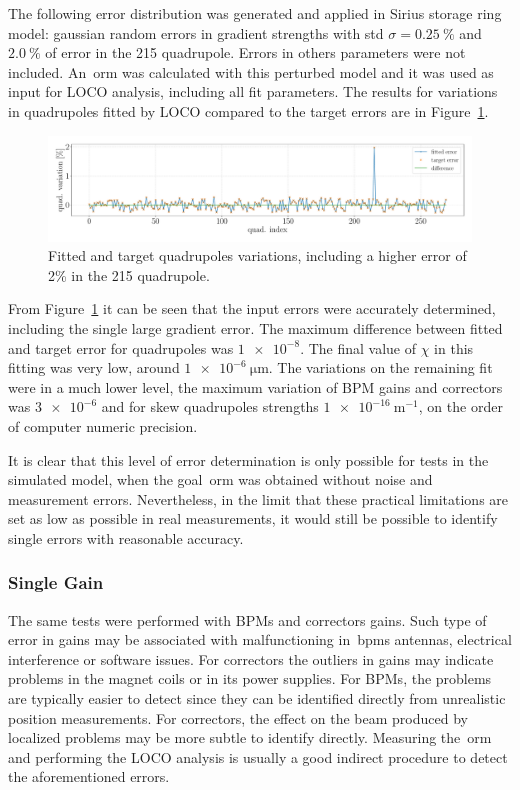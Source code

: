 The following error distribution was generated and applied in Sirius storage ring model: gaussian random errors in gradient strengths with std $\sigma=\SI{0.25}{\%}$ and $\SI{2.0}{\%}$ of error in the 215 quadrupole. Errors in others parameters were not included. An~\gls{orm} was calculated with this perturbed model and it was used as input for LOCO analysis, including all fit parameters. The results for variations in quadrupoles fitted by LOCO compared to the target errors are in Figure~\ref{fig:single_quad_detec}.
\begin{figure}[h!]
\centering
\includegraphics[width=1.0\textwidth]{figures/single_quaderror_detection_big.pdf}
\caption{Fitted and target quadrupoles variations, including a higher error of 2\% in the 215 quadrupole.}
\label{fig:single_quad_detec}
\end{figure}

From Figure~\ref{fig:single_quad_detec} it can be seen that the input errors were accurately determined, including the single large gradient error. The maximum difference between fitted and target error for quadrupoles was $\num{1e-8}$. The final value of $\chi$ in this fitting was very low, around $\SI{1e-6}{\micro\meter}$. The variations on the remaining fit were in a much lower level, the maximum variation of BPM gains and correctors was $\num{3e-6}$ and for skew quadrupoles strengths $\SI{1e-16}{\meter^{-1}}$, on the order of computer numeric precision.

It is clear that this level of error determination is only possible for tests in the simulated model, when the goal~\gls{orm} was obtained without noise and measurement errors. Nevertheless, in the limit that these practical limitations are set as low as possible in real measurements, it would still be possible to identify single errors with reasonable accuracy.
\subsubsection{Single Gain}
The same tests were performed with BPMs and correctors gains. Such type of error in gains may be associated with malfunctioning in~\glspl{bpm} antennas, electrical interference or software issues. For correctors the outliers in gains may indicate problems in the magnet coils or in its power supplies. For BPMs, the problems are typically easier to detect since they can be identified directly from unrealistic position measurements. For correctors, the effect on the beam produced by localized problems may be more subtle to identify directly. Measuring the~\gls{orm} and performing the LOCO analysis is usually a good indirect procedure to detect the aforementioned errors.

